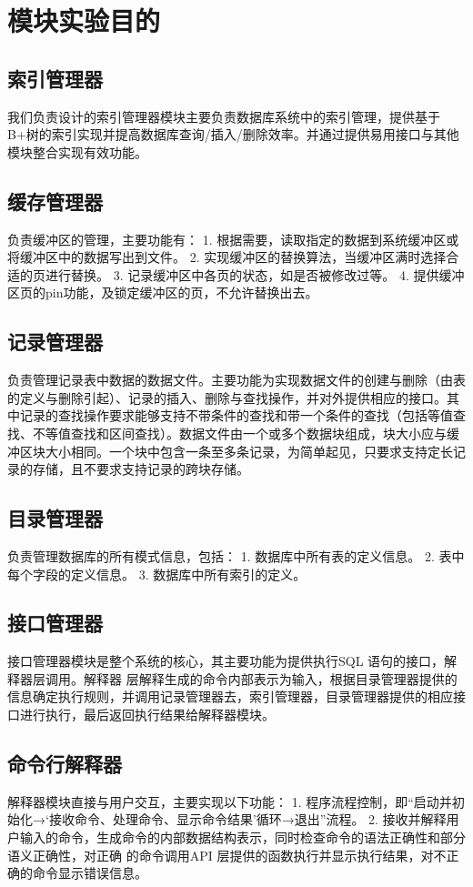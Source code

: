 \documentclass[UTF8]{ctexrep} %
\begin{document}
\section{模块实验目的}
\subsection{索引管理器}
我们负责设计的索引管理器模块主要负责数据库系统中的索引管理，提供基于B+树的索引实现并提高数据库查询/插入/删除效率。并通过提供易用接口与其他模块整合实现有效功能。

\subsection{缓存管理器}
负责缓冲区的管理，主要功能有：
1. 根据需要，读取指定的数据到系统缓冲区或将缓冲区中的数据写出到文件。
2. 实现缓冲区的替换算法，当缓冲区满时选择合适的页进行替换。
3. 记录缓冲区中各页的状态，如是否被修改过等。
4. 提供缓冲区页的pin功能，及锁定缓冲区的页，不允许替换出去。

\subsection{记录管理器}
负责管理记录表中数据的数据文件。主要功能为实现数据文件的创建与删除（由表的定义与删除引起）、记录的插入、删除与查找操作，并对外提供相应的接口。其中记录的查找操作要求能够支持不带条件的查找和带一个条件的查找（包括等值查找、不等值查找和区间查找）。数据文件由一个或多个数据块组成，块大小应与缓冲区块大小相同。一个块中包含一条至多条记录，为简单起见，只要求支持定长记录的存储，且不要求支持记录的跨块存储。

\subsection{目录管理器}
负责管理数据库的所有模式信息，包括：
1. 数据库中所有表的定义信息。
2. 表中每个字段的定义信息。
3. 数据库中所有索引的定义。

\subsection{接口管理器}
接口管理器模块是整个系统的核心，其主要功能为提供执行SQL 语句的接口，解释器层调用。解释器 层解释生成的命令内部表示为输入，根据目录管理器提供的信息确定执行规则，并调用记录管理器去，索引管理器，目录管理器提供的相应接口进行执行，最后返回执行结果给解释器模块。

\subsection{命令行解释器}
解释器模块直接与用户交互，主要实现以下功能：
1. 程序流程控制，即“启动并初始化→‘接收命令、处理命令、显示命令结果’循环→退出”流程。
2. 接收并解释用户输入的命令，生成命令的内部数据结构表示，同时检查命令的语法正确性和部分语义正确性，对正确
的命令调用API 层提供的函数执行并显示执行结果，对不正确的命令显示错误信息。
\end{document}
